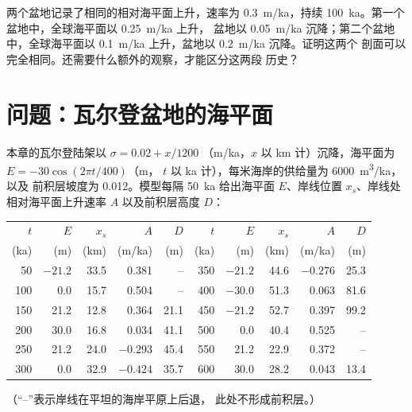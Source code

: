 \begin{exercise}[$\star\star\star$]\label{exo:b3:sequence-stratigraphy:12}
两个盆地记录了相同的相对海平面上升，速率为 \qty{0.3}{m/ka}，持续
\qty{100}{ka}。第一个盆地中，全球海平面以 \qty{0.25}{m/ka} 上升，
盆地以 \qty{0.05}{m/ka} 沉降；第二个盆地中，全球海平面以
\qty{0.1}{m/ka} 上升，盆地以 \qty{0.2}{m/ka} 沉降。证明这两个
剖面可以完全相同。还需要什么额外的观察，才能区分这两段
历史？
\end{exercise}

\section{问题：瓦尔登盆地的海平面}

\begin{problem}
\label{pb:b3:sequence-stratigraphy:1}
本章的瓦尔登陆架以 $\sigma = 0.02 + x/1200$
（\unit{m/ka}，$x$ 以 km 计）沉降，海平面为 $E = -30\cos(2\pi t/400)$（m，
$t$ 以 ka 计），每米海岸的供给量为 \qty{6000}{m^3/ka}，以及
前积层坡度为 0.012。模型每隔 \qty{50}{ka} 给出海平面
$E$、岸线位置 $x_s$、岸线处相对海平面上升速率
$A$ 以及前积层高度 $D$：

\begin{center}\small
\begin{tabular}{rrrrr|rrrrr}
$t$ & $E$ & $x_s$ & $A$ & $D$ & $t$ & $E$ & $x_s$ & $A$ & $D$\\
(ka) & (m) & (km) & (m/ka) & (m) & (ka) & (m) & (km) & (m/ka) & (m)\\\hline
50 & $-21.2$ & 33.5 & 0.381 & -- & 350 & $-21.2$ & 44.6 & $-0.276$ & 25.3\\
100 & 0.0 & 15.7 & 0.504 & -- & 400 & $-30.0$ & 51.3 & 0.063 & 81.6\\
150 & 21.2 & 12.8 & 0.364 & 21.1 & 450 & $-21.2$ & 52.7 & 0.397 & 99.2\\
200 & 30.0 & 16.8 & 0.034 & 41.1 & 500 & 0.0 & 40.4 & 0.525 & --\\
250 & 21.2 & 24.0 & $-0.293$ & 45.4 & 550 & 21.2 & 22.9 & 0.372 & --\\
300 & 0.0 & 32.9 & $-0.424$ & 35.7 & 600 & 30.0 & 28.2 & 0.043 & 13.4\\
\end{tabular}
\end{center}
（“--”表示岸线在平坦的海岸平原上后退，
此处不形成前积层。）


\end{problem}
